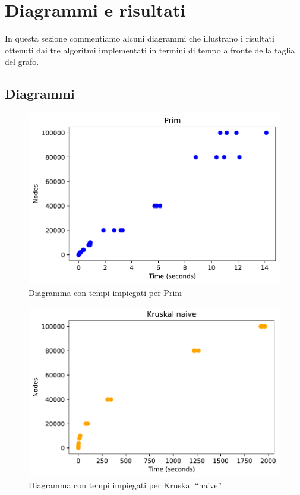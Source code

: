 \chapter{Diagrammi e risultati\label{sec:risultati}}
\noindent In questa sezione commentiamo alcuni diagrammi che illustrano i risultati ottenuti dai tre algoritmi implementati in termini di tempo a fronte della taglia del grafo.

\section{Diagrammi\label{sec:diagrammi}}

\begin{figure}[htp]
    \centering
    \includegraphics[width=\textwidth]{immagini/prim.pdf}
    \caption{Diagramma con tempi impiegati per Prim}
    \label{fig:diagramma-prim}
\end{figure}

\begin{figure}[htp]
    \centering
    \includegraphics[width=\textwidth]{immagini/naive.pdf}
    \caption{Diagramma con tempi impiegati per Kruskal ``naive''}
    \label{fig:diagramma-naive}
\end{figure}

